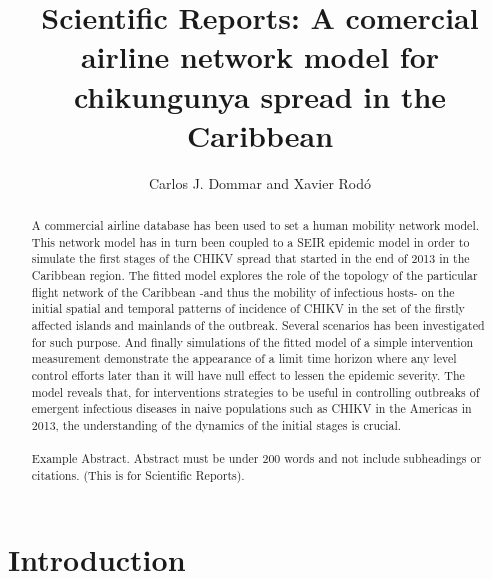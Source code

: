 \documentclass[10pt,a4paper]{article}
\title{Scientific Reports: A comercial airline network model for chikungunya spread in the Caribbean}
\author{Carlos J. Dommar and Xavier Rod\'o}
\begin{document}
\maketitle
\begin{abstract}
A commercial airline database has been used to set a human mobility network model.  
%
This network model has in turn been coupled to a SEIR epidemic model in order to simulate the first stages of the CHIKV spread that started in the end of 2013 in the Caribbean region.
% 
The fitted model explores the role of the topology of the particular flight network of the Caribbean -and thus the mobility of infectious hosts- on the initial spatial and temporal patterns of incidence of CHIKV in the set of the firstly affected islands and mainlands of the outbreak. 
%
Several scenarios has been investigated for such purpose. 
%
And finally simulations of the fitted model of a simple intervention measurement demonstrate the appearance of a limit time horizon where any level control efforts later than it will have null effect to lessen the epidemic severity. 
%
The model reveals that, for interventions strategies to be useful in controlling outbreaks of emergent infectious diseases in naive populations such as CHIKV in the Americas in 2013, the understanding of the dynamics of the initial stages is crucial.
\\\\
Example Abstract. Abstract must be under 200 words and not include subheadings or citations. (This is for Scientific Reports). 
\end{abstract}


\section*{Introduction}
\end{document}
